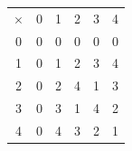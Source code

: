 \documentclass{article}
\begin{document}
\begin{latin}
\begin{table}[H]
\centering
\begin{tabular}{cccccc}
$\times$               & 0                      & 1                      & 2                      & 3                      & 4                      \\ \cline{2-6} 
\multicolumn{1}{c|}{0} & \multicolumn{1}{c|}{0} & \multicolumn{1}{c|}{0} & \multicolumn{1}{c|}{0} & \multicolumn{1}{c|}{0} & \multicolumn{1}{c|}{0} \\ \cline{2-6} 
\multicolumn{1}{c|}{1} & \multicolumn{1}{c|}{0} & \multicolumn{1}{c|}{1} & \multicolumn{1}{c|}{2} & \multicolumn{1}{c|}{3} & \multicolumn{1}{c|}{4} \\ \cline{2-6} 
\multicolumn{1}{c|}{2} & \multicolumn{1}{c|}{0} & \multicolumn{1}{c|}{2} & \multicolumn{1}{c|}{4} & \multicolumn{1}{c|}{1} & \multicolumn{1}{c|}{3} \\ \cline{2-6} 
\multicolumn{1}{c|}{3} & \multicolumn{1}{c|}{0} & \multicolumn{1}{c|}{3} & \multicolumn{1}{c|}{1} & \multicolumn{1}{c|}{4} & \multicolumn{1}{c|}{2} \\ \cline{2-6} 
\multicolumn{1}{c|}{4} & \multicolumn{1}{c|}{0} & \multicolumn{1}{c|}{4} & \multicolumn{1}{c|}{3} & \multicolumn{1}{c|}{2} & \multicolumn{1}{c|}{1} \\ \cline{2-6} 
\end{tabular}
\end{table}
\end{latin}
\end{document}
